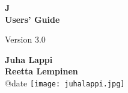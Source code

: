 \documentclass{ol-softwaremanual}
\theoremstyle{break}
\begin{document}
\begin{titlepage}
   \begin{center}
       \vspace*{1cm}
\Huge
\textbf{J}\\
       \textbf{Users' Guide}

       \vspace{0.5cm}
       \Large
        Version 3.0
            
       \vspace{1.5cm}
\huge
       \textbf{Juha Lappi }\\
       \textbf{ Reetta Lempinen}\\
\vspace{1cm}
      \normalsize
      @date
     \vspace{1cm}
       \texttt{[image: juhalappi.jpg]}
    
            
   \end{center}
\end{titlepage}


\tableofcontents
\newpage



\end{document}
